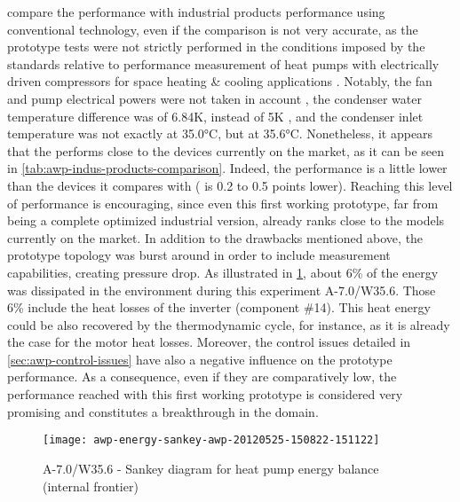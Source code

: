 compare the \AWP{} performance with industrial products performance
using conventional technology, even if the comparison is not very
accurate, as the prototype tests were not strictly performed in the
conditions imposed by the standards relative to performance
measurement of heat pumps with electrically driven compressors for
space heating \& cooling
applications \citep{EN-14511-1,EN-14511-2,EN-14511-3,EN-14511-4,EN-14825}
. Notably, the fan and pump
electrical powers were not taken in account \citep[sec.\,4.1.4 and
4.1.6]{EN-14511-3}, the condenser water temperature difference was of
\num{6.84}\si{\kelvin}, instead of
5\si{\kelvin} \citep[tab.\,12]{EN-14511-2}, and the
condenser inlet temperature was not exactly at
\num{35.0}\si{\degreeCelsius}, but at
\num{35.6}\si{\degreeCelsius}. Nonetheless, it appears that the \AWP{}
performs close to the devices currently on the market, as it can be
seen in \cref{tab:awp-indus-products-comparison}. Indeed, the \AWP{}
performance is a little lower than the devices it compares with
(\COP{} is 0.2 to 0.5 points lower). Reaching this level of
performance is encouraging, since even this first working prototype,
far from being a complete optimized industrial version, already ranks
close to the models currently on the market. In addition to the
drawbacks mentioned above, the prototype topology was burst around in
order to include measurement capabilities, creating pressure drop. As
illustrated in \cref{fig:awp-A-7.0/W35.6-sankey-energy}, about 6\% of
the energy was dissipated in the environment during this experiment
A-7.0/W35.6. Those 6\% include the heat losses of the
inverter (component \#14). This heat
energy could be also recovered by the thermodynamic cycle, for
instance, as it is already the case for the motor heat
losses. Moreover, the control issues detailed in
\cref{sec:awp-control-issues} have also a negative influence on the
prototype performance. As a consequence, even if they are
comparatively low, the performance reached with this first working
prototype is considered very promising and constitutes a breakthrough
in the domain.

\begin{figure}[htbp]
  \centering
  \texttt{[image: awp-energy-sankey-awp-20120525-150822-151122]}
  \caption{A-7.0/W35.6 - Sankey diagram for heat pump energy balance (internal frontier)}
  \label{fig:awp-A-7.0/W35.6-sankey-energy}
\end{figure}


